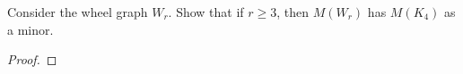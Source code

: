 \prob
{
	Consider the wheel graph $W_r$. Show that if $r \geq 3$, then $M(W_r)$ has
	$M(K_4)$ as a minor.
}
\begin{proof}
\end{proof}